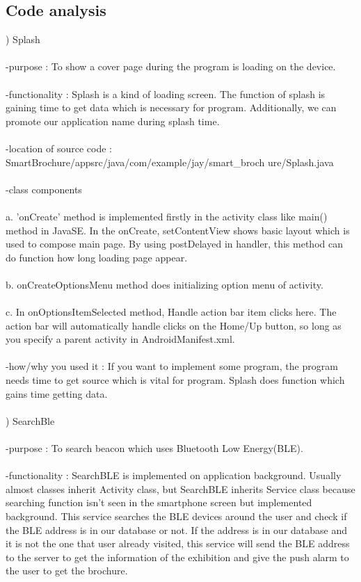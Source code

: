 \documentclass[conference]{IEEEtran}
\begin{document}
\subsection{Code analysis}
) Splash\\\\
-purpose : To show a cover page during the program is loading on the device. \\
\\ -functionality : Splash is a kind of loading screen. The function of splash is gaining time to get data which is necessary for program. Additionally, we can promote our application name during splash time.\\
\\ -location of source code : SmartBrochure/appsrc/java/com/example/jay/smart\_broch
ure/Splash.java\\
\\ -class components\\
\\ a. 'onCreate' method is implemented firstly in the activity class like main() method in JavaSE. In the onCreate, setContentView shows basic layout which is used to compose main page. By using postDelayed in handler, this method can do function how long loading page appear. \\
\\ b. onCreateOptionsMenu method does initializing option menu of activity.\\
\\c. In onOptionsItemSelected method, Handle action bar item clicks here. The action bar will automatically handle clicks on the Home/Up button, so long as you specify a parent activity in AndroidManifest.xml.\\
\\ -how/why you used it : If you want to implement some program, the program needs time to get source which is vital for program. Splash does function which gains time getting data.\\\\
) SearchBle\\\\
-purpose : To search beacon which uses Bluetooth Low Energy(BLE). \\
\\ -functionality : SearchBLE is implemented on application background. Usually almost classes inherit Activity class, but SearchBLE inherits Service class because searching function isn’t seen in the smartphone screen but implemented background. This service searches the BLE devices around the user and check if the BLE address is in our database or not. If the address is in our database and it is not the one that user already visited, this service will send the BLE address to the server to get the information of the exhibition and give the push alarm to the user to get the brochure.\\
\end{document}
